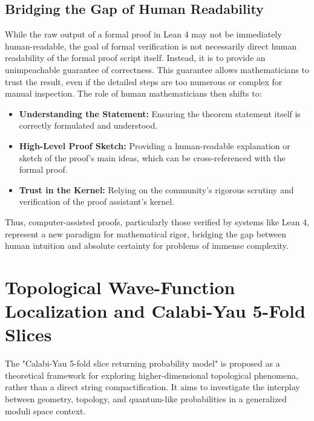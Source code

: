 \documentclass{book}
\theoremstyle{definition}
\begin{document}
\subsection{Bridging the Gap of Human Readability}
While the raw output of a formal proof in Lean 4 may not be immediately human-readable, the goal of formal verification is not necessarily direct human readability of the formal proof script itself. Instead, it is to provide an unimpeachable guarantee of correctness. This guarantee allows mathematicians to trust the result, even if the detailed steps are too numerous or complex for manual inspection. The role of human mathematicians then shifts to:
\begin{itemize}
    \item \textbf{Understanding the Statement:} Ensuring the theorem statement itself is correctly formulated and understood.
    \item \textbf{High-Level Proof Sketch:} Providing a human-readable explanation or sketch of the proof's main ideas, which can be cross-referenced with the formal proof.
    \item \textbf{Trust in the Kernel:} Relying on the community's rigorous scrutiny and verification of the proof assistant's kernel.
\end{itemize}
Thus, computer-assisted proofs, particularly those verified by systems like Lean 4, represent a new paradigm for mathematical rigor, bridging the gap between human intuition and absolute certainty for problems of immense complexity.

\section{Topological Wave-Function Localization and Calabi-Yau 5-Fold Slices}
The "Calabi-Yau 5-fold slice returning probability model" is proposed as a theoretical framework for exploring higher-dimensional topological phenomena, rather than a direct string compactification. It aims to investigate the interplay between geometry, topology, and quantum-like probabilities in a generalized moduli space context.
\end{document}
